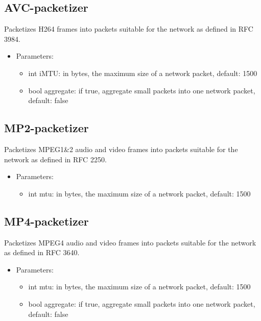 \subsection{AVC-packetizer}
Packetizes H264 frames into packets suitable for the network as defined in RFC 3984.
\begin{itemize}
\item Parameters:
\begin{itemize}
\item int iMTU: in bytes, the maximum size of a network packet, default: 1500
\item bool aggregate: if true, aggregate small packets into one network packet, default: false
\end{itemize}
\end{itemize}
\subsection{MP2-packetizer}
Packetizes MPEG1\&2 audio and video frames into packets suitable for the network as defined in RFC 2250.
\begin{itemize}
\item Parameters:
\begin{itemize}
\item int mtu: in bytes, the maximum size of a network packet, default: 1500
\end{itemize}
\end{itemize}
\subsection{MP4-packetizer}
Packetizes MPEG4 audio and video frames into packets suitable for the network as defined in RFC 3640.
\begin{itemize}
\item Parameters:
\begin{itemize}
\item int mtu: in bytes, the maximum size of a network packet, default: 1500
\item bool aggregate: if true, aggregate small packets into one network packet, default: false
\end{itemize}
\end{itemize}
